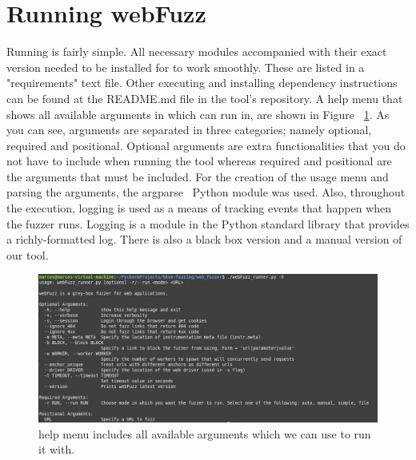 \section{Running webFuzz}
Running \pname{} is fairly simple. All necessary modules accompanied with their exact version needed to be installed for \pname{} to work smoothly. These are listed in a "requirements" text file. Other executing and installing dependency instructions can be found at the README.md file in the tool's repository. A help menu that shows all available arguments in which \pname{} can run in, are shown in Figure ~\ref{fig:argparser_menu}. As you can see, arguments are separated in three categories; namely optional, required and positional. Optional arguments are extra functionalities that you do not have to include when running the tool whereas required and positional are the arguments that must be included. For the creation of the usage menu and parsing the arguments, the argparse~\cite{argparse} Python module was used.
Also, throughout the execution, logging is used as a means of tracking events that happen when the fuzzer runs. Logging is a module in the Python standard library that provides a richly-formatted log.
There is also a black box version and a manual version of our tool.
\begin{figure}[ht]
 \centering
 \captionsetup{justification=centering}
 \includegraphics[width=\linewidth]{figures/argparser_menu.jpg}
 \caption{\pname{} help menu includes all available arguments which we can use to run it with.}
 \label{fig:argparser_menu}
\end{figure}
